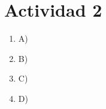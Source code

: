 \section*{Actividad 2}
\begin{enumerate}
	\item[] A) 
	    
	\item[] B) 
		
	\item[] C) 
		
	\item[] D) 
		
\end{enumerate}
